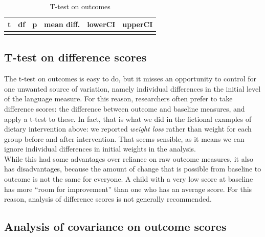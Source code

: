 \documentclass{krantz}
\begin{document}
\begin{table}

\caption{\label{tab:ttestoutcomes}T-test on outcomes}
\centering
\begin{tabular}[t]{cccccc}
\toprule
t & df & p & mean diff. & lowerCI & upperCI\\
\midrule
\cellcolor{gray!6}{2.602} & \cellcolor{gray!6}{52} & \cellcolor{gray!6}{0.006} & \cellcolor{gray!6}{5.94} & \cellcolor{gray!6}{2.117} & \cellcolor{gray!6}{Inf}\\
\bottomrule
\end{tabular}
\end{table}

\hypertarget{t-test-on-difference-scores}{%
\subsection{T-test on difference scores}\label{t-test-on-difference-scores}}

The t-test on outcomes is easy to do, but it misses an opportunity to control for one unwanted source of variation, namely individual differences in the initial level of the language measure. For this reason, researchers often prefer to take difference scores: the difference between outcome and baseline measures, and apply a t-test to these. In fact, that is what we did in the fictional examples of dietary intervention above: we reported \emph{weight loss} rather than weight for each group before and after intervention. That seems sensible, as it means we can ignore individual differences in initial weights in the analysis.\\
While this had some advantages over reliance on raw outcome measures, it also has disadvantages, because the amount of change that is possible from baseline to outcome is not the same for everyone. A child with a very low score at baseline has more ``room for improvement'' than one who has an average score. For this reason, analysis of difference scores is not generally recommended.

\hypertarget{analysis-of-covariance-on-outcome-scores}{%
\subsection{Analysis of covariance on outcome scores}\label{analysis-of-covariance-on-outcome-scores}}
\end{document}
